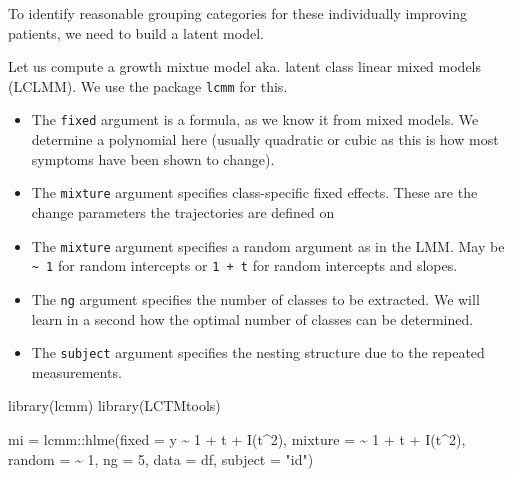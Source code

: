 \documentclass[
]{book}
\newenvironment{Shaded}{\begin{snugshade}}{\end{snugshade}}
\newcommand{\AttributeTok}[1]{\textcolor[rgb]{0.77,0.63,0.00}{#1}}
\newcommand{\DecValTok}[1]{\textcolor[rgb]{0.00,0.00,0.81}{#1}}
\newcommand{\FunctionTok}[1]{\textcolor[rgb]{0.00,0.00,0.00}{#1}}
\newcommand{\NormalTok}[1]{#1}
\newcommand{\OtherTok}[1]{\textcolor[rgb]{0.56,0.35,0.01}{#1}}
\newcommand{\SpecialCharTok}[1]{\textcolor[rgb]{0.00,0.00,0.00}{#1}}
\newcommand{\StringTok}[1]{\textcolor[rgb]{0.31,0.60,0.02}{#1}}
\begin{document}
To identify reasonable grouping categories for these individually improving patients, we need to build a latent model.

Let us compute a growth mixtue model aka. latent class linear mixed models (LCLMM). We use the package \texttt{lcmm} for this.

\begin{itemize}
\item
  The \texttt{fixed} argument is a formula, as we know it from mixed models. We determine a polynomial here (usually quadratic or cubic as this is how most symptoms have been shown to change).
\item
  The \texttt{mixture} argument specifies class-specific fixed effects. These are the change parameters the trajectories are defined on
\item
  The \texttt{mixture} argument specifies a random argument as in the LMM. May be \texttt{\textasciitilde{}\ 1} for random intercepts or \texttt{1\ +\ t} for random intercepts and slopes.
\item
  The \texttt{ng} argument specifies the number of classes to be extracted. We will learn in a second how the optimal number of classes can be determined.
\item
  The \texttt{subject} argument specifies the nesting structure due to the repeated measurements.
\end{itemize}

\begin{Shaded}
\begin{Highlighting}[]
\FunctionTok{library}\NormalTok{(lcmm)}
\FunctionTok{library}\NormalTok{(LCTMtools)}

\NormalTok{mi }\OtherTok{=}\NormalTok{ lcmm}\SpecialCharTok{::}\FunctionTok{hlme}\NormalTok{(}\AttributeTok{fixed =}\NormalTok{ y }\SpecialCharTok{\textasciitilde{}} \DecValTok{1} \SpecialCharTok{+}\NormalTok{ t }\SpecialCharTok{+} \FunctionTok{I}\NormalTok{(t}\SpecialCharTok{\^{}}\DecValTok{2}\NormalTok{),}
           \AttributeTok{mixture =} \SpecialCharTok{\textasciitilde{}} \DecValTok{1} \SpecialCharTok{+}\NormalTok{ t }\SpecialCharTok{+} \FunctionTok{I}\NormalTok{(t}\SpecialCharTok{\^{}}\DecValTok{2}\NormalTok{),}
           \AttributeTok{random =} \SpecialCharTok{\textasciitilde{}} \DecValTok{1}\NormalTok{,}
           \AttributeTok{ng =} \DecValTok{5}\NormalTok{,}
           \AttributeTok{data =}\NormalTok{ df,}
           \AttributeTok{subject =} \StringTok{"id"}\NormalTok{)}
\end{Highlighting}
\end{Shaded}
\end{document}
